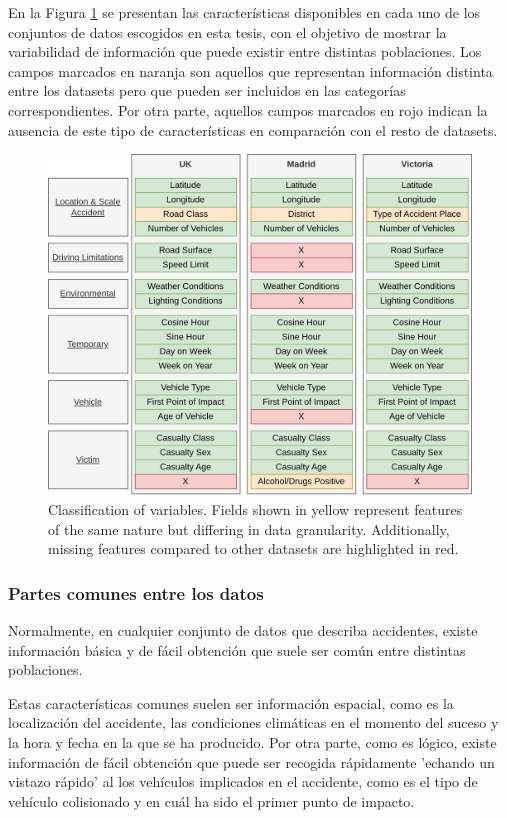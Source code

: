\documentclass{uathesis-es}
\begin{document}
En la Figura \ref{FeaturesClassification} se presentan las características disponibles en cada uno de los conjuntos de datos escogidos en esta tesis, con el objetivo de mostrar la variabilidad de información que puede existir entre distintas poblaciones. Los campos marcados en naranja son aquellos que representan información distinta entre los datasets pero que pueden ser incluidos en las categorías correspondientes. Por otra parte, aquellos campos marcados en rojo indican la ausencia de este tipo de características en comparación con el resto de datasets.

\begin{figure}[H]
    \centering
    \includegraphics[width=14cm]{Figures/Dataset Comparative.png}
    \caption{Classification of variables. Fields shown in yellow represent features of the same nature but differing in data granularity. Additionally, missing features compared to other datasets are highlighted in red.}
    \label{FeaturesClassification}
\end{figure}

\subsubsection{Partes comunes entre los datos}

Normalmente, en cualquier conjunto de datos que describa accidentes, existe información básica y de fácil obtención que suele ser común entre distintas poblaciones.

Estas características comunes suelen ser información espacial, como es la localización del accidente, las condiciones climáticas en el momento del suceso y la hora y fecha en la que se ha producido. Por otra parte, como es lógico, existe información de fácil obtención que puede ser recogida rápidamente 'echando un vistazo rápido' al los vehículos implicados en el accidente, como es el tipo de vehículo colisionado y en cuál ha sido el primer punto de impacto.
\end{document}

